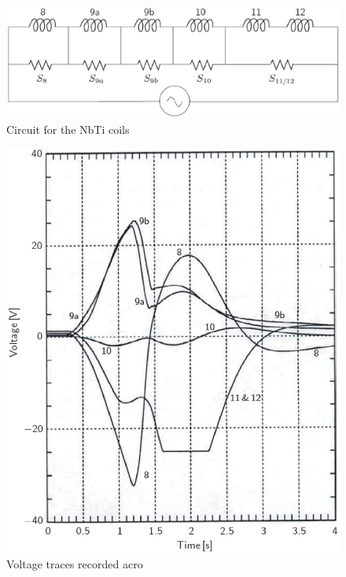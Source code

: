 {\begin{figure}
	\centering
	\includegraphics[scale=0.6]{chpt8/figs/fig8.27.eps}
	\caption{Circuit for the NbTi coils}
\end{figure}


\begin{figure}
	\centering
	\includegraphics[scale=0.6]{chpt8/figs/fig8.28.eps}
	\caption{Voltage traces recorded acro}
\end{figure}


}
